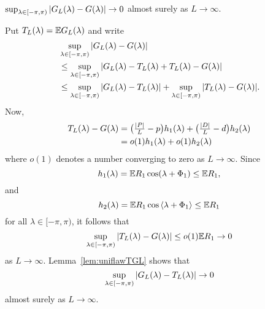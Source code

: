 \documentclass[journal]{IEEEtran}
\begin{document}
 

\begin{lemma}\label{lem:uniflawGGL} 
$\sup_{\lambda \in [-\pi, \pi)}{\vert G_L(\lambda) - G(\lambda) \vert} \rightarrow 0$ almost surely as $L \rightarrow \infty$.
\end{lemma}
\begin{IEEEproof}
Put $T_L(\lambda) = {\mathbb E} G_L(\lambda)$ and write
\begin{align*}
&\sup_{\lambda \in [-\pi, \pi)}{\vert G_L(\lambda) - G(\lambda) \vert} \\
&\leq \sup_{\lambda \in [-\pi, \pi)}{\vert G_L(\lambda) - T_L(\lambda) + T_L(\lambda) - G(\lambda) \vert} \\
&\leq \sup_{\lambda \in [-\pi, \pi)}{\vert G_L(\lambda) - T_L(\lambda) \vert} +  \sup_{\lambda \in [-\pi, \pi)}{\vert T_L(\lambda) - G(\lambda) \vert}.
\end{align*}
Now,
\begin{align*}
T_L(\lambda) - G(\lambda) &= \big(\tfrac{{\left\vert P \right\vert}}{L} - p\big)h_1(\lambda) + \big(\tfrac{{\left\vert D \right\vert}}{L} - d\big)h_2(\lambda) \\
&= o(1) h_1(\lambda) + o(1) h_2(\lambda)
\end{align*}
where $o(1)$ denotes a number converging to zero as $L \rightarrow \infty$.  Since 
\[
h_1(\lambda) = {\mathbb E} R_1\cos(\lambda + \Phi_1) \leq {\mathbb E} R_1,
\]
and 
\[
h_2(\lambda) = {\mathbb E} R_1\cos\left\langle \lambda + \Phi_1 \right\rangle \leq {\mathbb E} R_1
\] 
for all $\lambda \in [-\pi, \pi)$, it follows that 
\[
\sup_{\lambda \in [-\pi, \pi)}{\vert T_L(\lambda) - G(\lambda) \vert} \leq o(1) {\mathbb E} R_1 \rightarrow 0
\]  
as $L\rightarrow \infty$.  Lemma~\ref{lem:uniflawTGL} shows that 
\[
\sup_{\lambda \in [-\pi, \pi)}{\vert G_L(\lambda) - T_L(\lambda) \vert} \rightarrow 0
\]
almost surely as $L\rightarrow \infty$.
\end{IEEEproof}
\end{document}
